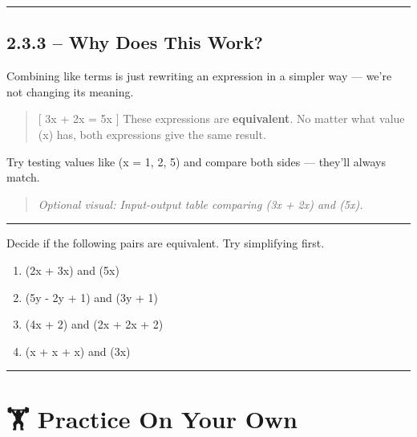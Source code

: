\documentclass[
  letterpaper,
  DIV=11,
  numbers=noendperiod]{scrreprt}
\providecommand{\tightlist}{%
  \setlength{\itemsep}{0pt}\setlength{\parskip}{0pt}}
\begin{document}
\begin{center}\rule{0.5\linewidth}{0.5pt}\end{center}

\subsection*{2.3.3 -- Why Does This Work?}\label{why-does-this-work}

Combining like terms is just rewriting an expression in a simpler way
--- we're not changing its meaning.

\begin{quote}
{[} 3x + 2x = 5x {]} These expressions are \textbf{equivalent}. No
matter what value (x) has, both expressions give the same result.
\end{quote}

Try testing values like (x = 1, 2, 5) and compare both sides --- they'll
always match.

\begin{quote}
\emph{Optional visual: Input-output table comparing (3x + 2x) and (5x).}
\end{quote}

\begin{center}\rule{0.5\linewidth}{0.5pt}\end{center}

Decide if the following pairs are equivalent. Try simplifying first.

\begin{enumerate}
\def\labelenumi{\arabic{enumi}.}
\tightlist
\item
  (2x + 3x) and (5x)\\
\item
  (5y - 2y + 1) and (3y + 1)\\
\item
  (4x + 2) and (2x + 2x + 2)\\
\item
  (x + x + x) and (3x)\\
\end{enumerate}

\begin{center}\rule{0.5\linewidth}{0.5pt}\end{center}

\section*{🏋️ Practice On Your Own}\label{practice-on-your-own-9}
\end{document}
